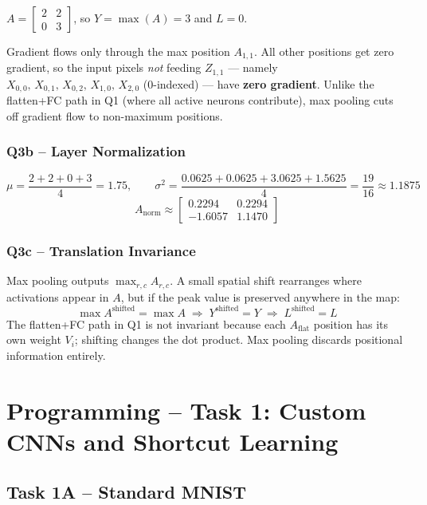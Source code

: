 \documentclass[12pt,a4paper]{article}
\begin{document}
$A = \begin{bmatrix}2&2\\0&3\end{bmatrix}$, so $\boxed{Y = \max(A) = 3}$ and $L = 0$.

Gradient flows only through the max position $A_{1,1}$. All other positions get zero gradient, so the input pixels \emph{not} feeding $Z_{1,1}$ — namely $X_{0,0},\,X_{0,1},\,X_{0,2},\,X_{1,0},\,X_{2,0}$ (0-indexed) — have \textbf{zero gradient}. Unlike the flatten+FC path in Q1 (where all active neurons contribute), max pooling cuts off gradient flow to non-maximum positions.

\subsubsection*{Q3b – Layer Normalization}

\[
\mu = \frac{2+2+0+3}{4} = 1.75, \qquad
\sigma^2 = \frac{0.0625+0.0625+3.0625+1.5625}{4} = \frac{19}{16} \approx 1.1875
\]
\[
\boxed{A_\text{norm} \approx \begin{bmatrix} 0.2294 & 0.2294 \\ -1.6057 & 1.1470 \end{bmatrix}}
\]

\subsubsection*{Q3c – Translation Invariance}

Max pooling outputs $\max_{r,c} A_{r,c}$. A small spatial shift rearranges where activations appear in $A$, but if the peak value is preserved anywhere in the map:
\[
\max A^{\text{shifted}} = \max A \;\Rightarrow\; Y^{\text{shifted}} = Y \;\Rightarrow\; L^{\text{shifted}} = L
\]
The flatten+FC path in Q1 is not invariant because each $A_\text{flat}$ position has its own weight $V_i$; shifting changes the dot product. Max pooling discards positional information entirely.

\section{Programming – Task 1: Custom CNNs and Shortcut Learning}

\subsection{Task 1A – Standard MNIST}
\end{document}
